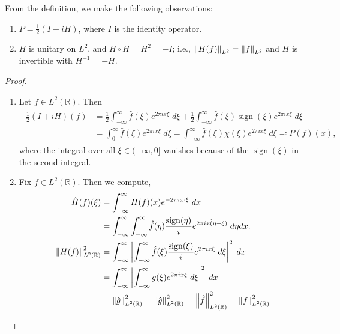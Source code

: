 \documentclass{article}
\begin{document}
From the definition, we make the following observations: \vspace{-0.45cm} 
\begin{enumerate}[itemsep =-2pt,label = (\roman{*})]
	\item $P = \frac{1}{2}(I + iH)$, where $I$ is the identity operator. 
	\item $H$ is unitary on $L^{2}$, and $H \circ H= H^{2} = -I$; i.e., $\left\Vert H(f) \right\Vert_{L^{2}} =\left\Vert f \right\Vert_{L^{2}}$ and $H$ is invertible with $H^{-1} = -H$. 
\end{enumerate}
\begin{proof}
	$ $\newline \vspace{-0.65cm}
	\begin{enumerate}[itemsep =-2pt,label = (\roman{*})]
		\item Let $f \in L^{2}(\mathbb{R})$. Then 
		\begin{align*}
			\begin{split}
				\frac{1}{2}(I + iH)(f) &= \frac{1}{2}\int_{-\infty}^{\infty}\hat{f}(\xi)e^{2\pi i x\xi}\;d\xi + \frac{1}{2}\int_{-\infty}^{\infty}\hat{f}(\xi)\operatorname{sign}(\xi)e^{2\pi i x\xi}\;d\xi \\
				&= \int_{0}^{\infty}\hat{f}(\xi)e^{2\pi i x \xi}\;d\xi = \int_{-\infty}^{\infty}\hat{f}(\xi)\chi(\xi)e^{2\pi i x \xi}\;d\xi \eqqcolon P(f)(x), 
			\end{split} 
		\end{align*}
		where the integral over all $\xi \in (-\infty, 0]$ vanishes because of the $\operatorname{sign}(\xi)$ in the second integral.  
		\item Fix $f \in L^{2}(\mathbb{R})$. Then we compute, 
		\begin{align*}
			\begin{split} 
				\hat{H}(f)(\xi) &= \int_{-\infty}^{\infty}H(f)(x)e^{-2\pi i x \cdot \xi}\;dx \\
				&= \int_{-\infty}^{\infty}\int_{-\infty}^{\infty}\hat{f}(\eta)\frac{\operatorname{sign}(\eta)}{i}e^{2\pi i x \dot (\eta - \xi)}\;d\eta dx. \\
				\left\Vert H(f) \right\Vert_{L^{2}(\mathbb{R})}^{2} &= \int_{-\infty}^{\infty}\left| \int_{-\infty}^{\infty}\hat{f}(\xi)\frac{\operatorname{sign}(\xi)}{i}e^{2\pi i x \xi}\;d\xi \right|^{2}\;dx \\
				&= \int_{-\infty}^{\infty}\left| \int_{-\infty}^{\infty}g(\xi)e^{2\pi i x \xi}\;d\xi \right|^{2}\;dx  \\
				&= \left\Vert \hat{g} \right\Vert_{L^{2}(\mathbb{R})}^{2} = \left\Vert \hat{g} \right\Vert_{L^{2}(\mathbb{R})}^{2}  = \left\Vert \hat{f} \right\Vert_{L^{2}(\mathbb{R})}^{2} = \left\Vert f \right\Vert_{L^{2}(\mathbb{R})}^{2}
			\end{split} 
		\end{align*} 
	\end{enumerate}
\end{proof} 
\end{document}
